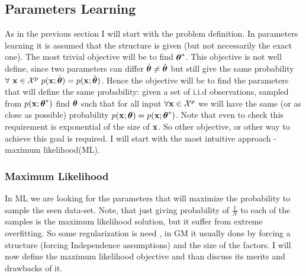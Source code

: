 \subsection{Parameters Learning}
As in the previous section I will start with the problem definition. 
In parameters learning it is assumed that the structure is given (but not necessarily the exact one). The most trivial objective will be to find ${\boldsymbol{\theta}}^{*}$.  
This  objective is not well define,  since two parameters can differ $\hat{\boldsymbol{\theta}} \neq \tilde{\boldsymbol{\theta}}$ but still give the same probability $\forall\ {\bf x} \in {\cal X}^p\ p({\bf x};\hat{\boldsymbol{\theta}}) = p({\bf x};\tilde{\boldsymbol{\theta}})$.
Hence the objective will be to find the parameters that will define the same probability: given a set of i.i.d observations, sampled from $p({\bf x};{\boldsymbol{\theta}}^{*})$ find $\boldsymbol{\theta}$ such that for all input $\forall {\bf x} \in {\cal X}^{p}$ we will have the same (or as close as possible) probability $p({\bf x};\boldsymbol{\theta}) = p({\bf x};{\boldsymbol{\theta}}^{*})$.
Note that even to check this requirement is exponential of the size of ${\bf x}$.
So other objective, or other way to achieve this goal is required.
I will start with the  most intuitive approach - maximum likelihood(ML).

\subsubsection{Maximum Likelihood}
In ML we are looking for the parameters that will maximize the probability to sample the seen data-set.
Note, that just giving probability of $\frac{1}{N}$ to each of the samples is the maximum likelihood solution, but it suffer from extreme overfitting.
So some regularization is need , in GM it usually done by forcing a structure (forcing Independence assumptions) and the size of the factors.
I will now define the maximum likelihood objective and than discuss its merits and drawbacks of it.

